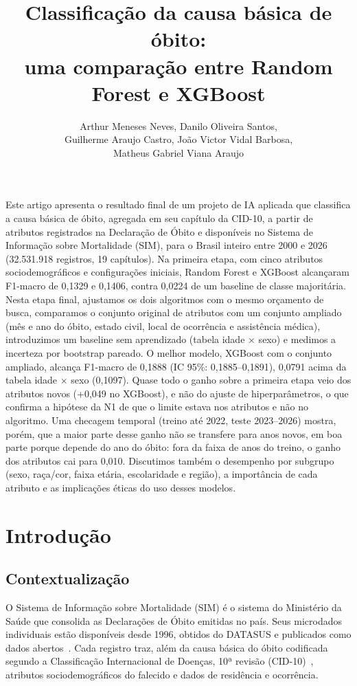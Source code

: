 \documentclass[12pt]{article}
\title{Classificação da causa básica de óbito:\\
  uma comparação entre Random Forest e XGBoost}
\author{Arthur Meneses Neves, Danilo Oliveira Santos,\\
  Guilherme Araujo Castro, João Victor Vidal Barbosa,\\
  Matheus Gabriel Viana Araujo}}
\begin{document}
\maketitle

\begin{resumo}
  Este artigo apresenta o resultado final de um projeto de IA aplicada que classifica a causa básica de óbito, agregada em seu capítulo da CID-10, a partir de atributos registrados na Declaração de Óbito e disponíveis no Sistema de Informação sobre Mortalidade (SIM), para o Brasil inteiro entre 2000 e 2026 (32.531.918 registros, 19 capítulos). Na primeira etapa, com cinco atributos sociodemográficos e configurações iniciais, Random Forest e XGBoost alcançaram F1-macro de 0,1329 e 0,1406, contra 0,0224 de um baseline de classe majoritária. Nesta etapa final, ajustamos os dois algoritmos com o mesmo orçamento de busca, comparamos o conjunto original de atributos com um conjunto ampliado (mês e ano do óbito, estado civil, local de ocorrência e assistência médica), introduzimos um baseline sem aprendizado (tabela idade $\times$ sexo) e medimos a incerteza por bootstrap pareado. O melhor modelo, XGBoost com o conjunto ampliado, alcança F1-macro de 0,1888 (IC 95\%: 0,1885--0,1891), 0,0791 acima da tabela idade $\times$ sexo (0,1097). Quase todo o ganho sobre a primeira etapa veio dos atributos novos (+0,049 no XGBoost), e não do ajuste de hiperparâmetros, o que confirma a hipótese da N1 de que o limite estava nos atributos e não no algoritmo. Uma checagem temporal (treino até 2022, teste 2023--2026) mostra, porém, que a maior parte desse ganho não se transfere para anos novos, em boa parte porque depende do ano do óbito: fora da faixa de anos do treino, o ganho dos atributos cai para 0,010. Discutimos também o desempenho por subgrupo (sexo, raça/cor, faixa etária, escolaridade e região), a importância de cada atributo e as implicações éticas do uso desses modelos.
\end{resumo}

\section{Introdução}

\subsection{Contextualização}

O Sistema de Informação sobre Mortalidade (SIM) é o sistema do Ministério da Saúde que consolida as Declarações de Óbito emitidas no país. Seus microdados individuais estão disponíveis desde 1996, obtidos do DATASUS e publicados como dados abertos~\cite{pcdas_sim,sim_dadosgov}. Cada registro traz, além da causa básica do óbito codificada segundo a Classificação Internacional de Doenças, 10ª revisão (CID-10)~\cite{who_cid10}, atributos sociodemográficos do falecido e dados de residência e ocorrência.
\end{document}
